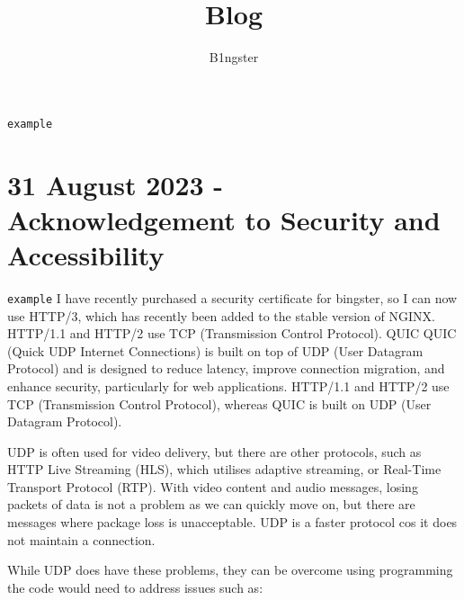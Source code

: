 \documentclass{article}
\title{Blog}
\author{B1ngster}
\date{}
\newcommand{\cmdname}[1]{\texttt{#1}}
\begin{document}
\maketitle
\newpage


\tableofcontents
\newpage\cmdname{example}



\section*{31 August 2023 - \\ Acknowledgement to Security and Accessibility}


\cmdname{example}
I have recently purchased a security certificate for bingster, so I can now use HTTP/3, which has recently been added to the stable version of NGINX.   HTTP/1.1 and HTTP/2 use TCP (Transmission Control Protocol). QUIC QUIC (Quick UDP Internet Connections)  is built on top of UDP (User Datagram Protocol) and is designed to reduce latency, improve connection migration, and enhance security, particularly for web applications. HTTP/1.1 and HTTP/2 use TCP (Transmission Control Protocol), whereas QUIC is built on UDP (User Datagram Protocol). 

UDP is often used for video delivery, but there are other protocols, such as HTTP Live Streaming (HLS), which utilises adaptive streaming, or Real-Time Transport Protocol (RTP). With video content and audio messages, losing packets of data is not a problem as we can quickly move on, but there are messages where package loss is unacceptable. UDP is a faster protocol cos it does not maintain a connection. 

While UDP does have these problems, they can be overcome using programming the code would need to address issues such as:
\end{document}
